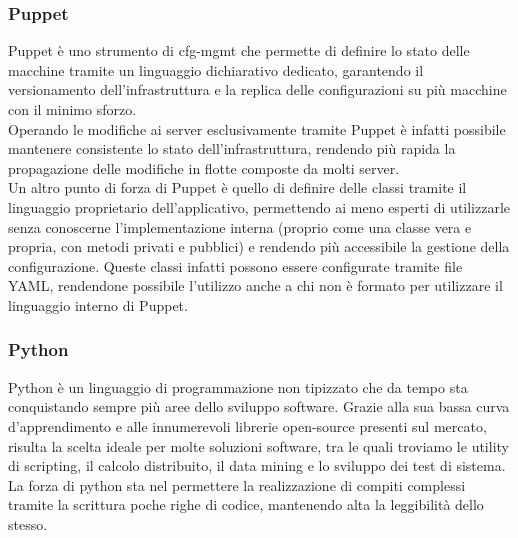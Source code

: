 \subsubsection{Puppet}
Puppet è uno strumento di \gls{cfg-mgmt} che permette di definire lo stato delle macchine tramite un linguaggio dichiarativo dedicato, garantendo il versionamento dell'infrastruttura e la replica delle configurazioni su più macchine con il minimo sforzo. \\
Operando le modifiche ai server esclusivamente tramite Puppet è infatti possibile mantenere consistente lo stato dell'infrastruttura, rendendo più rapida la propagazione delle modifiche in flotte composte da molti server. \\
Un altro punto di forza di Puppet è quello di definire delle classi tramite il linguaggio proprietario dell'applicativo, permettendo ai meno esperti di utilizzarle senza conoscerne l'implementazione interna (proprio come una classe vera e propria, con metodi privati e pubblici) e rendendo più accessibile la gestione della configurazione. Queste classi infatti possono essere configurate tramite file YAML, rendendone possibile l'utilizzo anche a chi non è formato per utilizzare il linguaggio interno di Puppet.
\subsubsection{Python}
Python è un linguaggio di programmazione non tipizzato che da tempo sta conquistando sempre più aree dello sviluppo software. Grazie alla sua bassa curva d'apprendimento e alle innumerevoli librerie open-source presenti sul mercato, risulta la scelta ideale per molte soluzioni software, tra le quali troviamo le utility di scripting, il calcolo distribuito, il data mining e lo sviluppo dei test di sistema. \\
La forza di python sta nel permettere la realizzazione di compiti complessi tramite la scrittura poche righe di codice, mantenendo alta la leggibilità dello stesso. \\